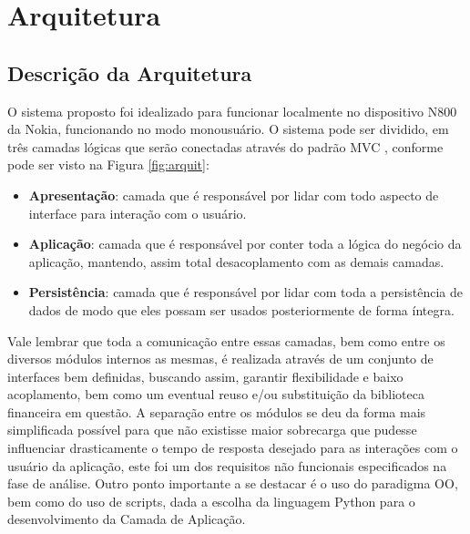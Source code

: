\chapter{Arquitetura}


\section{Descrição da Arquitetura}

O sistema proposto foi idealizado para funcionar localmente no dispositivo N800 da Nokia, funcionando no modo monousuário. O sistema pode ser dividido, em três camadas lógicas que serão conectadas através do padrão MVC \cite{mvc}, conforme pode ser visto na Figura \ref{fig:arquit}:
\begin{itemize}
 \item \textbf{Apresentação}: camada que é responsável por lidar com todo aspecto de interface para interação com o usuário.
 \item \textbf{Aplicação}: camada que é responsável por conter toda a lógica do negócio da aplicação, mantendo, assim total desacoplamento com as demais camadas.
 \item \textbf{Persistência}: camada que é responsável por lidar com toda a persistência de dados de modo que eles possam ser usados posteriormente de forma íntegra.
\end{itemize}

Vale lembrar que toda a comunicação entre essas camadas, bem como entre os diversos módulos internos as mesmas, é realizada através de um conjunto de interfaces bem definidas, buscando assim, garantir flexibilidade e baixo acoplamento, bem como um eventual reuso e/ou substituição da biblioteca financeira em questão. A separação entre os módulos se deu da forma mais simplificada possível para que não existisse maior sobrecarga que pudesse influenciar drasticamente o tempo de resposta desejado para as interações com o usuário da aplicação, este foi um dos requisitos não funcionais especificados na fase de análise.
Outro ponto importante a se destacar é o uso do paradigma OO, bem como do uso de scripts, dada a escolha da linguagem Python para o desenvolvimento da Camada de Aplicação.

